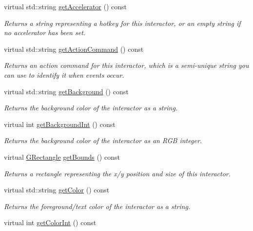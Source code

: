 \begin{DoxyCompactItemize}
virtual std\+::string \mbox{\hyperlink{classGInteractor_a69f8d23ed8f207fbecad99960776e942}{get\+Accelerator}} () const
\begin{DoxyCompactList}\small\item\em Returns a string representing a hotkey for this interactor, or an empty string if no accelerator has been set. \end{DoxyCompactList}\item 
virtual std\+::string \mbox{\hyperlink{classGInteractor_a94eb4276000c4fdfb508ce9e6317a82a}{get\+Action\+Command}} () const
\begin{DoxyCompactList}\small\item\em Returns an action command for this interactor, which is a semi-\/unique string you can use to identify it when events occur. \end{DoxyCompactList}\item 
virtual std\+::string \mbox{\hyperlink{classGInteractor_a808e22cc1fdfbecf71ed8c64ef4600e0}{get\+Background}} () const
\begin{DoxyCompactList}\small\item\em Returns the background color of the interactor as a string. \end{DoxyCompactList}\item 
virtual int \mbox{\hyperlink{classGInteractor_a9e827257a55cb8cf4d9de2ec6bcfd7a0}{get\+Background\+Int}} () const
\begin{DoxyCompactList}\small\item\em Returns the background color of the interactor as an R\+GB integer. \end{DoxyCompactList}\item 
virtual \mbox{\hyperlink{classGRectangle}{G\+Rectangle}} \mbox{\hyperlink{classGInteractor_a29e6ac35a0b48f491a4c88194cc5da3b}{get\+Bounds}} () const
\begin{DoxyCompactList}\small\item\em Returns a rectangle representing the x/y position and size of this interactor. \end{DoxyCompactList}\item 
virtual std\+::string \mbox{\hyperlink{classGInteractor_aa061dfa488c31e18549d64363c1d0e34}{get\+Color}} () const
\begin{DoxyCompactList}\small\item\em Returns the foreground/text color of the interactor as a string. \end{DoxyCompactList}\item 
virtual int \mbox{\hyperlink{classGInteractor_a9635c7af766cdc3417f346683fa0e6c1}{get\+Color\+Int}} () const

\end{DoxyCompactItemize}

